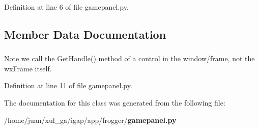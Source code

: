 Definition at line 6 of file gamepanel.py.

\subsection{Member Data Documentation}
\subsubsection{}\label{classapp_1_1frogger_1_1gamepanel_1_1GamePanel_1acde4fea256b91da92f2b10420ba8bd}


Note we call the GetHandle() method of a control in the window/frame, not the wxFrame itself. 



Definition at line 11 of file gamepanel.py.

The documentation for this class was generated from the following file:\begin{CompactItemize}
\item 
/home/juan/xul\_\-ga/igap/app/frogger/{\bf gamepanel.py}\end{CompactItemize}
